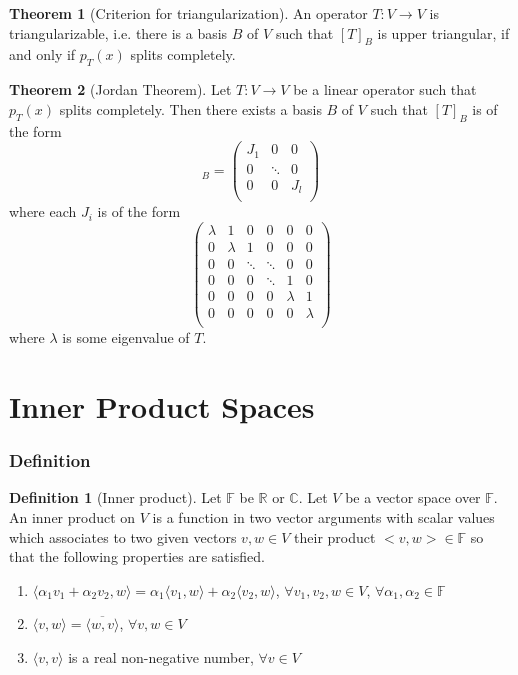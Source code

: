 \documentclass[fleqn, a4paper, 12pt]{article}
\theoremstyle{definition}
\newtheorem{definition}{Definition} %
\theoremstyle{theorem}
\newtheorem{theorem}{Theorem} %
\theoremstyle{remark}
\numberwithin{corollary}{theorem}
\numberwithin{equation}{theorem}
\begin{document}
\begin{theorem}[Criterion for triangularization]
	An operator $T : V \to V$ is triangularizable, i.e. there is a basis $B$ of $V$ such that $[T]_B$ is upper triangular, if and only if $p_T (x)$ splits completely.
\end{theorem}

\begin{theorem}[Jordan Theorem]
	Let $T : V \to V$ be a linear operator such that $p_T (x)$ splits completely. Then there exists a basis $B$ of $V$ such that $[T]_B$ is of the form
	\begin{equation*}
		[T]_B = 
		\begin{pmatrix}
			J_1 & 0 & 0\\
			0 & \ddots & 0\\
			0 & 0 & J_l\\
		\end{pmatrix}
	\end{equation*}
	where each $J_i$ is of the form
	\[
		\begin{pmatrix}
			\lambda & 1 & 0 & 0 & 0 & 0\\
			0 & \lambda & 1 & 0 & 0 & 0\\
			0 & 0 & \ddots & \ddots & 0 & 0\\
			0 & 0 & 0 & \ddots & 1 & 0\\
			0 & 0 & 0 & 0 &\lambda & 1\\
			0 & 0 & 0 & 0 & 0 & \lambda\\
		\end{pmatrix}
	\]
	where $\lambda$ is some eigenvalue of $T$.
\end{theorem}

\part{Inner Product Spaces}

\section{Definition}

\begin{definition}[Inner product]
	Let $\mathbb{F}$ be $\mathbb{R}$ or $\mathbb{C}$. Let $V$ be a vector space over $\mathbb{F}$. An inner product on $V$ is a function in two vector arguments with scalar values which associates to two given vectors $v, w \in V$ their product $<v, w> \in \mathbb{F}$ so that the following properties are satisfied.
	\begin{enumerate}
		\item $\langle \alpha_1 v_1 + \alpha_2 v_2, w \rangle = \alpha_1 \langle v_1, w \rangle + \alpha_2 \langle v_2, w \rangle$, $\forall v_1, v_2, w \in V$, $\forall \alpha_1, \alpha_2 \in \mathbb{F}$
		\item $\langle v, w \rangle = \overline{\langle w, v \rangle}$, $\forall v, w \in V$
		\item $\langle v, v \rangle$ is a real non-negative number, $\forall v \in V$
	\end{enumerate}
\end{definition}
\end{document}
